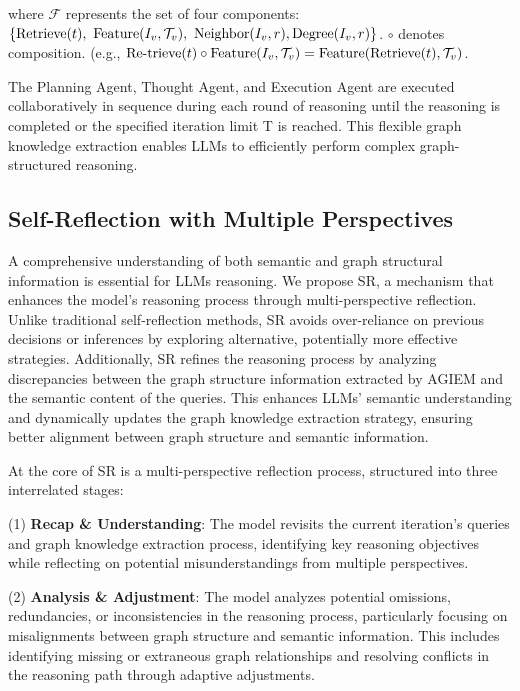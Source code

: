 \documentclass[11pt]{article}
\begin{document}
where $\mathcal{F}$ represents the set of four components: $\{\mathrm{Retrieve}(t),\  \mathrm{Feature}({I}_v,\mathcal{T}_v), \ \mathrm{Neighbor}(I_v,r), \ \\\mathrm{Degree}(I_v,r)\}$. $\circ$ denotes composition. (e.g., $\mathrm{Re}\text{-}\\ \mathrm{trieve}(t) \circ \mathrm{Feature}({I}_v,\mathcal{T}_v) = \mathrm{Feature}(\mathrm{Retrieve}(\\t), \mathcal{T}_v)$.

The Planning Agent, Thought Agent, and Execution Agent are executed collaboratively in sequence during each round of reasoning until the reasoning is completed or the specified iteration limit T is reached. This flexible graph knowledge extraction enables LLMs to efficiently perform complex graph-structured reasoning.


\subsection{Self-Reflection with Multiple Perspectives}
\label{subsec:SR}
A comprehensive understanding of both semantic and graph structural information is essential for LLMs reasoning. We propose SR, a mechanism that enhances the model’s reasoning process through multi-perspective reflection. Unlike traditional self-reflection methods, SR avoids over-reliance on previous decisions or inferences by exploring alternative, potentially more effective strategies. Additionally, SR refines the reasoning process by analyzing discrepancies between the graph structure information extracted by AGIEM and the semantic content of the queries. This enhances LLMs’ semantic understanding and dynamically updates the graph knowledge extraction strategy, ensuring better alignment between graph structure and semantic information.

At the core of SR is a multi-perspective reflection process, structured into three interrelated stages:

(1) \textbf{Recap \& Understanding}: The model revisits the current iteration’s queries and graph knowledge extraction process, identifying key reasoning objectives while reflecting on potential misunderstandings from multiple perspectives.

(2) \textbf{Analysis \& Adjustment}: The model analyzes potential omissions, redundancies, or inconsistencies in the reasoning process, particularly focusing on misalignments between graph structure and semantic information. This includes identifying missing or extraneous graph relationships and resolving conflicts in the reasoning path through adaptive adjustments.
\end{document}
